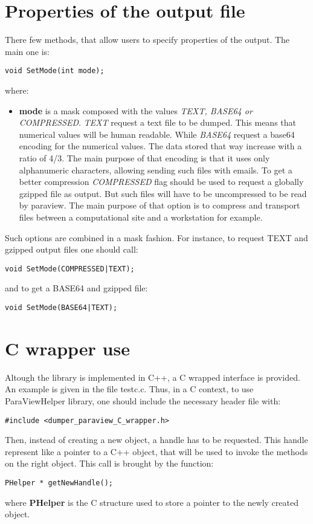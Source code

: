 \section{Properties of the output file}

There few methods, that allow users to specify properties of the output. The main one is:

\begin{lstlisting}[frame=tbrl]
void SetMode(int mode);
\end{lstlisting}

where:
\begin{itemize}
\item {\bf mode} is a mask composed with the values {\it TEXT, BASE64 or COMPRESSED}. 
{\it TEXT} request a text file to be dumped. This means that numerical values will be 
human readable. While {\it BASE64} request a base64 encoding for the numerical values.
The data stored that way increase with a ratio of 4/3. The main purpose of that encoding is that
it uses only alphanumeric characters, allowing sending such files with emails. To get a better
compression {\it COMPRESSED} flag should be used to request a globally gzipped file as output. But 
such files will have to be uncompressed to be read by paraview. The main purpose of that option 
is to compress and transport files between a computational site and a workstation for example.
\end{itemize}

Such options are combined in a mask fashion. For instance, to request TEXT and gzipped output files 
one should call:
\begin{lstlisting}[frame=tb,backgroundcolor=\color{white}]
void SetMode(COMPRESSED|TEXT);
\end{lstlisting}
and to get a BASE64 and gzipped file:
\begin{lstlisting}[frame=tb,backgroundcolor=\color{white}]
void SetMode(BASE64|TEXT);
\end{lstlisting}

\section{C wrapper use}

\noindent Altough the library is implemented in C++, a C wrapped interface is provided. An example 
is given in the file testc.c.
Thus, in a C context, to use ParaViewHelper library, one should include the necessary header file with:
\begin{lstlisting}[frame=tb,backgroundcolor=\color{white}]
#include <dumper_paraview_C_wrapper.h>
\end{lstlisting}
\noindent Then, instead of creating a new object, a handle has to be requested. This handle represent 
like a pointer to a C++ object, that will be used to invoke the methods on the right object. This call 
is brought by the function:
\begin{lstlisting}[frame=tbrl]
PHelper * getNewHandle();
\end{lstlisting}
where {\bf PHelper} is the C structure used to store a pointer to the newly created object. \\

